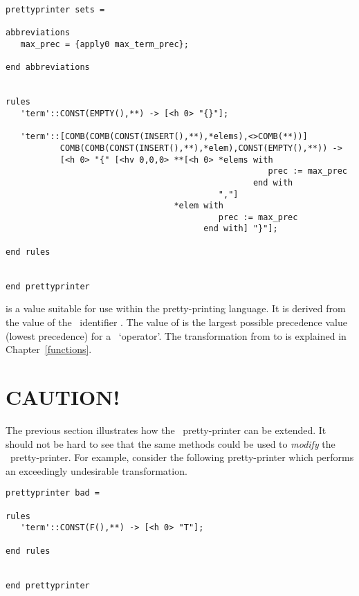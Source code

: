 \begin{window}\begin{verbatim}
prettyprinter sets =

abbreviations
   max_prec = {apply0 max_term_prec};

end abbreviations


rules
   'term'::CONST(EMPTY(),**) -> [<h 0> "{}"];

   'term'::[COMB(COMB(CONST(INSERT(),**),*elems),<>COMB(**))]
           COMB(COMB(CONST(INSERT(),**),*elem),CONST(EMPTY(),**)) ->
           [<h 0> "{" [<hv 0,0,0> **[<h 0> *elems with
                                                     prec := max_prec
                                                  end with
                                           ","]
                                  *elem with
                                           prec := max_prec
                                        end with] "}"];

end rules


end prettyprinter
\end{verbatim}\end{window}

\vfill

\noindent
{} is a value suitable for use within the pretty-printing
language. It is derived from the value of the \ML\ identifier
. The value of  is the largest
possible precedence value (lowest precedence) for a \HOL\ `operator'. The
transformation from  to  is explained in
Chapter~\ref{functions}.


\section{CAUTION!}

\setcounter{sessioncount}{1}

The previous section illustrates how the \HOL\ pretty-printer can be extended.
It should not be hard to see that the same methods could be used to
{\em modify\/} the \HOL\ pretty-printer. For example, consider the following
pretty-printer which performs an exceedingly undesirable transformation.

\begin{window}\begin{verbatim}
prettyprinter bad =

rules
   'term'::CONST(F(),**) -> [<h 0> "T"];

end rules


end prettyprinter
\end{verbatim}\end{window}

